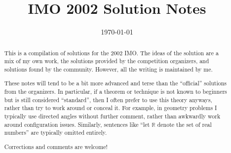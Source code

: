\documentclass[11pt]{scrartcl}
\title{IMO 2002 Solution Notes}
\date{\today}
\begin{document}
\maketitle

\begin{abstract}
This is a compilation of solutions
for the 2002 IMO.
The ideas of the solution are a mix of my own work,
the solutions provided by the competition organizers,
and solutions found by the community.
However, all the writing is maintained by me.

These notes will tend to be a bit more advanced and terse than the ``official''
solutions from the organizers.
In particular, if a theorem or technique is not known to beginners
but is still considered ``standard'', then I often prefer to
use this theory anyways, rather than try to work around or conceal it.
For example, in geometry problems I typically use directed angles
without further comment, rather than awkwardly work around configuration issues.
Similarly, sentences like ``let $\mathbb{R}$ denote the set of real numbers''
are typically omitted entirely.

Corrections and comments are welcome!
\end{abstract}

\tableofcontents
\newpage

\addtocounter{section}{-1}
\end{document}
